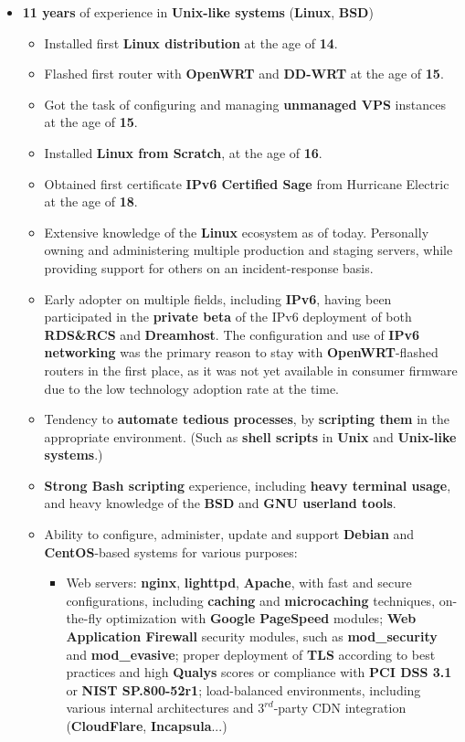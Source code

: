 \documentclass[11pt,a4paper,sans]{moderncv}
\begin{document}
	\begin{itemize}
	\item	\label{devops}  \textbf{11 years} of experience in \textbf{Unix-like systems} (\textbf{Linux}, \textbf{BSD})
		\begin{itemize}
		\item	Installed first \textbf{Linux distribution} at the age of \textbf{14}.
		\item	Flashed first router with \textbf{OpenWRT} and \textbf{DD-WRT} at the age of \textbf{15}.
		\item	Got the task of configuring and managing \textbf{unmanaged VPS} instances at the age of \textbf{15}.
		\item	Installed \textbf{Linux from Scratch}, at the age of \textbf{16}.
		\item	Obtained first certificate \textbf{IPv6 Certified Sage} from Hurricane Electric at the age of \textbf{18}.
		\item	Extensive knowledge of the \textbf{Linux} ecosystem as of today. Personally owning and administering multiple production and staging servers, while providing support for others on an incident-response basis.
		\item	Early adopter on multiple fields, including \textbf{IPv6}, having been participated in the \textbf{private beta} of the IPv6 deployment of both \textbf{RDS\&RCS} and \textbf{Dreamhost}. The configuration and use of \textbf{IPv6 networking} was the primary reason to stay with \textbf{OpenWRT}-flashed routers in the first place, as it was not yet available in consumer firmware due to the low technology adoption rate at the time.
		\item	Tendency to \textbf{automate tedious processes}, by \textbf{scripting them} in the appropriate environment. (Such as \textbf{shell scripts} in \textbf{Unix} and \textbf{Unix-like systems}.)
		\item	\textbf{Strong Bash scripting} experience, including \textbf{heavy terminal usage}, and heavy knowledge of the \textbf{BSD} and \textbf{GNU userland tools}.
		\item	Ability to configure, administer, update and support \textbf{Debian} and \textbf{CentOS}-based systems for various purposes:
			\begin{itemize}
			\item	Web servers: \textbf{nginx}, \textbf{lighttpd}, \textbf{Apache}, with fast and secure configurations, including \textbf{caching} and \textbf{microcaching} techniques, on-the-fly optimization with \textbf{Google PageSpeed} modules; \textbf{Web Application Firewall} security modules, such as \textbf{mod\_security} and \textbf{mod\_evasive}; proper deployment of \textbf{TLS} according to best practices and high \textbf{Qualys} scores or compliance with \textbf{PCI DSS 3.1} or \textbf{NIST SP.800-52r1}; load-balanced environments, including various internal architectures and $3^{rd}$-party CDN integration (\textbf{CloudFlare}, \textbf{Incapsula}...)

\end{itemize}
\end{itemize}
\end{itemize}
\end{document}
